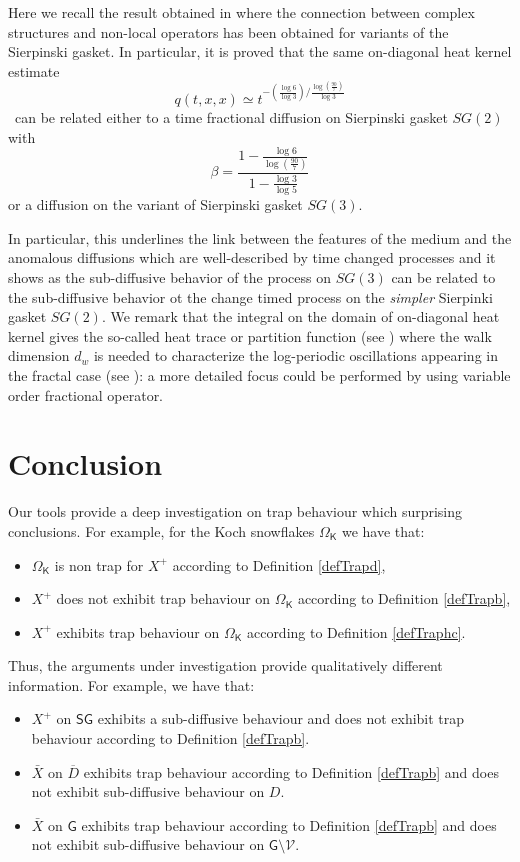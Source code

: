 \documentclass[[11pt,a4paper,reqno]{article}
\numberwithin{equation}{section}
\begin{document}
Here we recall the result obtained in \cite{RCAMS} where the connection between complex structures and non-local operators has been obtained for variants of the Sierpinski gasket.   
In particular, it is proved that the  same on-diagonal heat kernel estimate \begin{equation}\label{hkd} q(t, x,x) \simeq t^{-(\frac{\log 6}{\log 3})/\frac{\log(\frac{90}7)}{\log 3}} \end{equation}\
can be related  either to a time fractional diffusion on Sierpinski gasket  $SG(2)$ with $$\beta =\frac{1-\frac{\log 6}{\log(\frac{90}7)}}{1-\frac{\log3}{\log5}}$$ 
 or  a  diffusion on the  variant of Sierpinski gasket $SG(3)$.

 In particular, this  underlines the link between the features of the medium and the anomalous diffusions which are well-described by time changed processes
and it shows as the sub-diffusive behavior of the process on  $SG(3)$  can be related to the sub-diffusive behavior  ot the change timed process on the \textit{simpler}  Sierpinki gasket $SG(2).$
We remark that the integral on the domain of  on-diagonal heat kernel gives the so-called heat trace or partition function (see \cite{Vdb87}) where the walk dimension $d_w$ is needed to characterize the log-periodic oscillations appearing in the fractal case (see \cite{DUNNE}): a more detailed focus could be performed by using variable order fractional operator.

\section{Conclusion}

Our tools provide a deep investigation  on trap behaviour which surprising conclusions. For example, for the Koch snowflakes $\Omega_\mathsf{K}$ we have that:
\begin{itemize}
\item[i)] $\Omega_\mathsf{K}$ is non trap for $X^+$ according to Definition \eqref{defTrapd},
\item[ii)] $X^+$ does not exhibit trap behaviour on $\Omega_\mathsf{K}$ according to Definition \eqref{defTrapb},
\item[iii)] $X^+$ exhibits trap behaviour on $\Omega_\mathsf{K}$ according to Definition \eqref{defTraphc}.
\end{itemize}
Thus, the arguments under investigation provide qualitatively different information. For example, we have that:
\begin{itemize}
\item[i)] $X^+$ on $\mathsf{SG}$ exhibits a sub-diffusive behaviour and does not exhibit trap behaviour according to Definition \ref{defTrapb}. 
\item[ii)] $\bar{X}$ on $\overline{D}$ exhibits trap behaviour according to Definition \ref{defTrapb} and does not exhibit sub-diffusive behaviour on $D$.
\item[iii)] $\bar{X}$ on $\mathsf{G}$ exhibits trap behaviour according to Definition \ref{defTrapb} and does not exhibit sub-diffusive behaviour on $\mathsf{G} \setminus \mathcal{V}$.
\end{itemize}
\end{document}
